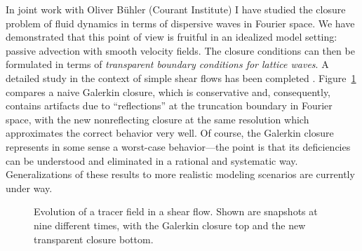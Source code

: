 In joint work with Oliver B\"uhler (Courant Institute) I have studied
the closure problem of fluid dynamics in terms of dispersive waves in
Fourier space.  We have demonstrated that this point of view is
fruitful in an idealized model setting: passive advection with smooth
velocity fields.  The closure conditions can then be formulated in
terms of \emph{transparent boundary conditions for lattice waves}.  A
detailed study in the context of simple shear flows has been completed
\cite{OliverBuehler}.  Figure~\ref{fig:OliverBuehler} compares a naive
Galerkin closure, which is conservative and, consequently, contains
artifacts due to ``reflections'' at the truncation boundary in Fourier
space, with the new nonreflecting closure at the same resolution which
approximates the correct behavior very well.  Of course, the Galerkin
closure represents in some sense a worst-case behavior---the point is
that its deficiencies can be understood and eliminated in a rational
and systematic way.  Generalizations of these results to more
realistic modeling scenarios are currently under way.

\begin{figure}[ht]
  \begin{center}
     \hfill
    \caption{Evolution of a tracer field in a shear flow.  Shown are
    snapshots at nine different times, with the Galerkin closure top
    and the new transparent closure bottom.}\label{fig:OliverBuehler}
   \end{center}
\end{figure}

